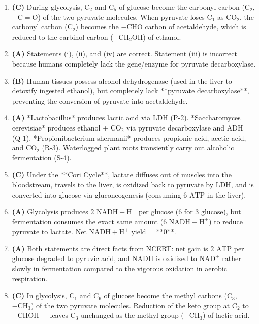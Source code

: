 \documentclass[11pt, a4paper]{article}
\begin{document}
\begin{enumerate}[label=\textbf{\arabic*.}]
\item \textbf{(C)} During glycolysis, $\text{C}_2$ and $\text{C}_5$ of glucose become the carbonyl carbon ($\text{C}_2$, $-\text{C}=\text{O}$) of the two pyruvate molecules. When pyruvate loses $\text{C}_1$ as $\text{CO}_2$, the carbonyl carbon ($\text{C}_2$) becomes the $-\text{CHO}$ carbon of acetaldehyde, which is reduced to the carbinol carbon ($-\text{CH}_2\text{OH}$) of ethanol.

\item \textbf{(A)} Statements (i), (ii), and (iv) are correct. Statement (iii) is incorrect because humans completely lack the gene/enzyme for pyruvate decarboxylase.

\item \textbf{(B)} Human tissues possess alcohol dehydrogenase (used in the liver to detoxify ingested ethanol), but completely lack **pyruvate decarboxylase**, preventing the conversion of pyruvate into acetaldehyde.

\item \textbf{(A)} *Lactobacillus* produces lactic acid via $\text{LDH}$ (P-2). *Saccharomyces cerevisiae* produces ethanol + $\text{CO}_2$ via pyruvate decarboxylase and $\text{ADH}$ (Q-1). *Propionibacterium shermanii* produces propionic acid, acetic acid, and $\text{CO}_2$ (R-3). Waterlogged plant roots transiently carry out alcoholic fermentation (S-4).

\item \textbf{(C)} Under the **Cori Cycle**, lactate diffuses out of muscles into the bloodstream, travels to the liver, is oxidized back to pyruvate by $\text{LDH}$, and is converted into glucose via gluconeogenesis (consuming $6\text{ ATP}$ in the liver).

\item \textbf{(A)} Glycolysis produces $2\text{ NADH} + \text{H}^+$ per glucose ($6$ for $3\text{ glucose}$), but fermentation consumes the exact same amount ($6\text{ NADH} + \text{H}^+$) to reduce pyruvate to lactate. Net $\text{NADH} + \text{H}^+$ yield = **$0$**.

\item \textbf{(A)} Both statements are direct facts from NCERT: net gain is $2\text{ ATP}$ per glucose degraded to pyruvic acid, and $\text{NADH}$ is oxidized to $\text{NAD}^+$ rather slowly in fermentation compared to the vigorous oxidation in aerobic respiration.

\item \textbf{(C)} In glycolysis, $\text{C}_1$ and $\text{C}_6$ of glucose become the methyl carbons ($\text{C}_3$, $-\text{CH}_3$) of the two pyruvate molecules. Reduction of the keto group at $\text{C}_2$ to $-\text{CHOH}-$ leaves $\text{C}_3$ unchanged as the methyl group ($-\text{CH}_3$) of lactic acid.


\end{enumerate}
\end{document}

